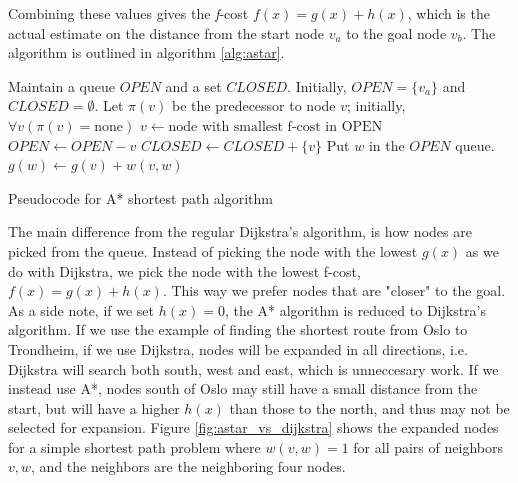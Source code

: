 Combining these values gives the {\textit f-cost} $f(x) = g(x)+h(x)$, which is the actual estimate on the distance from the start node $v_a$ to the goal node $v_b$. The algorithm is outlined in algorithm \ref{alg:astar}.

\begin{algorithm}
\begin{algorithmic}
\STATE Maintain a queue $OPEN$ and a set $CLOSED$. 
\STATE Initially, $OPEN = \{v_a\}$ and $CLOSED = \emptyset$. 
\STATE Let $\pi(v)$ be the predecessor to node $v$; initially, $\forall v (\pi(v) = \mbox{none})$ 
    \STATE $v \gets \mbox{node with smallest f-cost in OPEN}$
    \STATE $OPEN\gets OPEN - {v}$
    \STATE $CLOSED \gets CLOSED + \{v\}$
            \STATE Put $w$ in the $OPEN$ queue.
            \STATE $g(w) \gets g(v)+w(v,w)$
        \ENDIF
    \ENDFOR
\ENDWHILE
\end{algorithmic}
\caption{Pseudocode for A* shortest path algorithm}
\label{alg:astar}
\end{algorithm}

The main difference from the regular Dijkstra's algorithm, is how nodes are picked from the queue. Instead of picking the node with the lowest $g(x)$ as we do with Dijkstra, we pick the node with the lowest f-cost, $f(x) = g(x) + h(x)$. This way we prefer nodes that are "closer" to the goal. As a side note, if we set $h(x)=0$, the A* algorithm is reduced to Dijkstra's algorithm. If we use the example of finding the shortest route from Oslo to Trondheim, if we use Dijkstra, nodes will be expanded in all directions, i.e. Dijkstra will search both south, west and east, which is unneccesary work. If we instead use A*, nodes south of Oslo may still have a small distance from the start, but will have a higher $h(x)$ than those to the north, and thus may not be selected for expansion. Figure \ref{fig:astar_vs_dijkstra} shows the expanded nodes for a simple shortest path problem where $w(v,w)=1$ for all pairs of neighbors $v,w$, and the neighbors are the neighboring four nodes.

